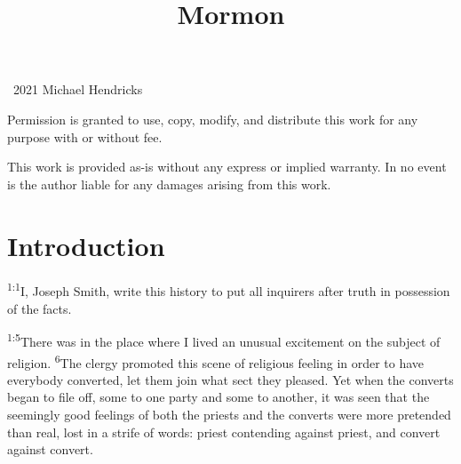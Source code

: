 \documentclass[openany,12pt,english]{book}
\title{Mormon}
\author{}
\date{}
\newenvironment{para}{\par\pretolerance=100\tolerance=200\setlength{\emergencystretch}{0.6em}\relax}{\par}
\begin{document}
\maketitle

{
\thispagestyle{empty}
\vspace*{\fill}
\begin{changemargin}{.8in}{.8in}
\begin{center}
\textcopyright{}~2021 Michael Hendricks

\vspace{0.5\baselineskip}

Permission is granted to use, copy, modify, and distribute
this work for any purpose with or without fee.

\vspace{0.5\baselineskip}

This work is provided as-is without any express or implied
warranty. In no event is the author liable for any damages
arising from this work.
\end{center}
\end{changemargin}
}
\clearpage{}

\tableofcontents
\clearpage{}

\markboth{}{}


\section*{Introduction}
\begin{para}
    \textsuperscript{1:1}\thinspace{}I, Jo\-seph Smith, write this his\-to\-ry to put all inquirers af\-ter truth in pos\-ses\-sion of the facts.
\end{para}

\begin{para}
    \textsuperscript{1:5}\thinspace{}There was in the place where I lived an un\-u\-su\-al ex\-cite\-ment on the sub\-ject of re\-li\-gion.
    \textsuperscript{6}\thinspace{}The cler\-gy pro\-mot\-ed this scene of re\-li\-gious feel\-ing in or\-der to have eve\-ry\-bod\-y con\-vert\-ed, let them join what sect they pleased. Yet when the converts be\-gan to file off, some to one par\-ty and some to an\-oth\-er, it was seen that the seemingly good feelings of both the priests and the converts were more pre\-tend\-ed than re\-al, lost in a strife of words: priest contending against priest, and con\-vert against con\-vert.
\end{para}
\end{document}
